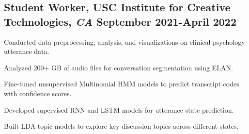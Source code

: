 \documentclass[11pt]{article}
\begin{document}
\subsection*{Student Worker{\normalfont, USC Institute for Creative
            Technologies,
            \textit{CA} \hfill
            September 2021-April 2022}}
\begin{asparaitem}
    \item Conducted data preprocessing, analysis, and visualizations on clinical psychology utterance data.
    \item Analyzed 200+ GB of audio files for conversation segmentation using ELAN.
    \item Fine-tuned unsupervised Multinomial HMM models to predict transcript codes with confidence scores.
    \item Developed supervised RNN and LSTM models for utterance state prediction.
    \item Built LDA topic models to explore key discussion topics across different states.
\end{asparaitem}

\end{document}
